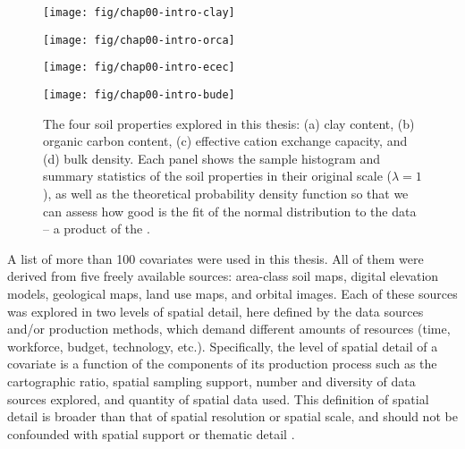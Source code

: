 \begin{figure}[!ht]
\centering
\begin{minipage}[b]{63mm}
\subcaption{}
\centering
\texttt{[image: fig/chap00-intro-clay]}
\end{minipage}
\begin{minipage}[b]{63mm}
\subcaption{}
\centering
\texttt{[image: fig/chap00-intro-orca]}
\end{minipage}
\begin{minipage}[b]{63mm}
\subcaption{}
\centering
\texttt{[image: fig/chap00-intro-ecec]}
\end{minipage}
\begin{minipage}[b]{63mm}
\subcaption{}
\centering
\texttt{[image: fig/chap00-intro-bude]}
\end{minipage}
\caption{The four soil properties explored in this thesis: (a) clay content, (b) organic carbon 
content, (c) effective cation exchange capacity, and (d) bulk density. Each panel shows the sample 
histogram and summary statistics of the soil properties in their original scale ($\lambda = 1$), as 
well as the theoretical probability density function so that we can assess how good is the fit of 
the normal distribution to the data -- a product of the .}
\label{fig:intro-soil-properties}
\end{figure}

A list of more than \num{100} covariates were used in this thesis. All of them were derived from 
five freely available sources: area-class soil maps, digital elevation models, geological maps,
land use maps, and orbital images. Each of these sources was explored in two levels of spatial 
detail, here defined by the data sources and/or production methods, which demand different amounts 
of resources (time, workforce, budget, technology, etc.). Specifically, the level of spatial detail 
of a covariate is a function of the components of its production process such as the cartographic 
ratio, spatial sampling support, number and diversity of data sources explored, and quantity of 
spatial data used. This definition of spatial detail is broader than that of spatial resolution
or spatial scale, and should not be confounded with spatial support \cite{WebsterEtAl2007} or 
thematic detail \cite{Rossiter2000}.

